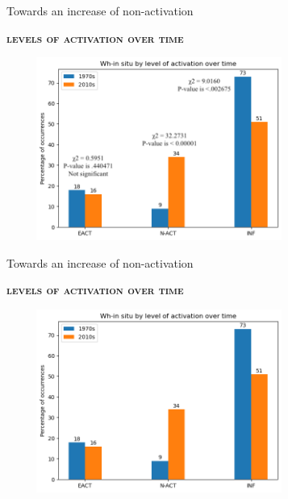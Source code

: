 \documentclass[lesson_slides]{subfiles}
\begin{document}
\begin{frame}[c]{Towards an increase of non-activation}

    \textbf{\textsc{levels of activation over time}}
    \begin{center}
        \includegraphics[width=10cm, height=6cm]{images/activationschi3.png}
    \end{center}
  
\end{frame}
\begin{frame}[c]{Towards an increase of non-activation}

    \textbf{\textsc{levels of activation over time}}
    \begin{center}
        \includegraphics[width=10cm, height=6cm]{images/activationsallb.png}
    \end{center}
  
\end{frame}
\end{document}
